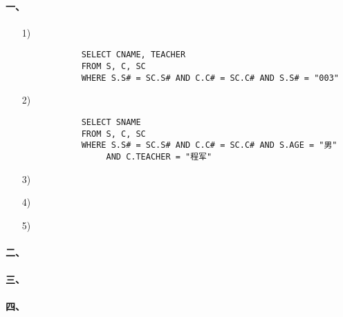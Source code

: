 \documentclass[10pt,a4paper]{article}
\begin{document}
	\pagestyle{main}    %
	
	\setlength{\parskip}{0pt}
	\renewcommand{\baselinestretch}{1.5}
	
    \paragraph{一、}
    \begin{enumerate}
        \item[1)] 
        \begin{verbatim}
            SELECT CNAME, TEACHER
            FROM S, C, SC
            WHERE S.S# = SC.S# AND C.C# = SC.C# AND S.S# = "003"
        \end{verbatim}
        \item[2)]\begin{verbatim}
            SELECT SNAME
            FROM S, C, SC
            WHERE S.S# = SC.S# AND C.C# = SC.C# AND S.AGE = "男"
                 AND C.TEACHER = "程军"
        \end{verbatim}
        \item[3)]
        \item[4)]
        \item[5)]   
    \end{enumerate}
    
    \paragraph{二、}
    
    \paragraph{三、}
    
    \paragraph{四、}
    
\end{document}
